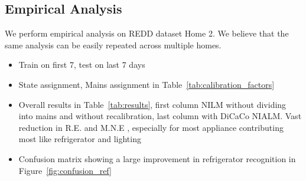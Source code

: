 \documentclass[conference]{IEEEtran}
\newcommand{\figref}[1]{Figure~\ref{#1}}
\newcommand{\tabref}[1]{Table~\ref{#1}}
\begin{document}
\subsection{Empirical Analysis}
We perform empirical analysis on REDD dataset Home 2. We believe that the same analysis can be easily repeated across multiple homes.  
\begin{itemize}
\item Train on first 7, test on last 7 days
\item State assignment, Mains assignment in \tabref{tab:calibration_factors}
\item Overall results in \tabref{tab:results}, first column NILM without dividing into mains and without recalibration, last column with DiCaCo NIALM. Vast reduction in R.E. and M.N.E , especially for most appliance contributing most like refrigerator and lighting	
\item Confusion matrix showing a large improvement in refrigerator recognition in \figref{fig:confusion_ref}
\end{itemize}
\end{document}
